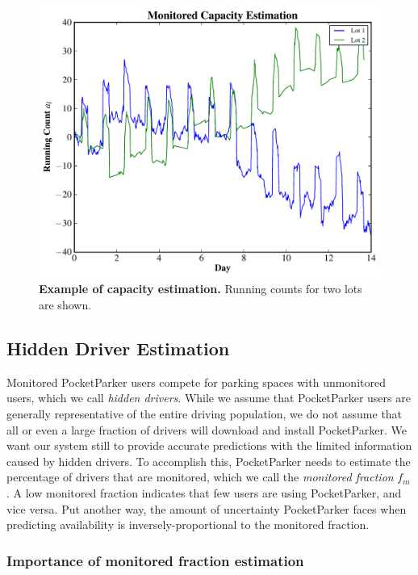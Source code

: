 \documentclass{sigchi}
\begin{document}
\begin{figure}
\centering
\includegraphics[width=\columnwidth]{./simulator/figures/capacity.pdf}

\caption{\textbf{Example of capacity estimation.} Running counts for two lots
are shown.}

\vspace*{-0.2in}
\label{fig-capacityexample}
\end{figure}

\subsection{Hidden Driver Estimation}

Monitored PocketParker users compete for parking spaces with unmonitored
users, which we call \textit{hidden drivers}. While we assume that
PocketParker users are generally representative of the entire driving
population, we do not assume that all or even a large fraction of drivers
will download and install PocketParker. We want our system still to provide
accurate predictions with the limited information caused by hidden drivers.
To accomplish this, PocketParker needs to estimate the percentage of drivers
that are monitored, which we call the \textit{monitored fraction} $f_m$. A
low monitored fraction indicates that few users are using PocketParker,
and vice versa. Put another way, the amount
of uncertainty PocketParker faces when predicting availability is
inversely-proportional to the monitored fraction.

\subsubsection{Importance of monitored fraction estimation}
\end{document}
